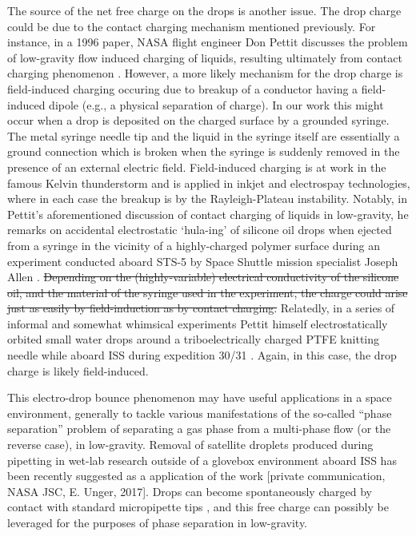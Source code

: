 \documentclass[aip,reprint, floatfix]{revtex4-1}
\begin{document}
The source of the net free charge on the drops is another issue. The drop charge could be due to the contact charging mechanism mentioned previously. For instance, in a 1996 paper, NASA flight engineer Don Pettit discusses the problem of low-gravity flow induced charging of liquids, resulting ultimately from contact charging phenomenon \cite{pettit_donald_flow_????}. However, a more likely mechanism for the drop charge is field-induced charging occuring due to breakup of a conductor having a field-induced dipole (e.g., a physical separation of charge). In our work this might occur when a drop is deposited on the charged surface by a grounded syringe. The metal syringe needle tip and the liquid in the syringe itself are essentially a ground connection which is broken when the syringe is suddenly removed in the presence of an external electric field. Field-induced charging is at work in the famous Kelvin thunderstorm and is applied in inkjet and electrospay technologies, where in each case the breakup is by the Rayleigh-Plateau instability. Notably, in Pettit's aforementioned discussion of contact charging of liquids in low-gravity, he remarks on accidental electrostatic `hula-ing' of silicone oil drops when ejected from a syringe in the vicinity of a highly-charged polymer surface during an experiment conducted aboard STS-5 by Space Shuttle mission specialist Joseph Allen \cite{pettit_donald_flow_????}. \sout{Depending on the (highly-variable) electrical conductivity of the silicone oil, and the material of the syringe used in the experiment, the charge could arise just as easily by field-induction as by contact charging.} Relatedly, in a series of informal and somewhat whimsical experiments Pettit himself electrostatically orbited small water drops around a triboelectrically charged PTFE knitting needle while aboard ISS during expedition 30/31 \cite{stevenson_electrostatic_2015}. Again, in this case, the drop charge is likely field-induced.

This electro-drop bounce phenomenon may have useful applications in a space environment, generally to tackle various manifestations of the so-called ``phase separation'' problem of separating a gas phase from a multi-phase flow (or the reverse case), in low-gravity. Removal of satellite droplets produced during pipetting in wet-lab research outside of a glovebox environment aboard ISS has been recently suggested as a application of the work [private communication, NASA JSC, E. Unger, 2017]. Drops can become spontaneously charged by contact with standard micropipette tips \citep{choi_spontaneous_2013}, and this free charge can possibly be leveraged for the purposes of phase separation in low-gravity.
\end{document}
